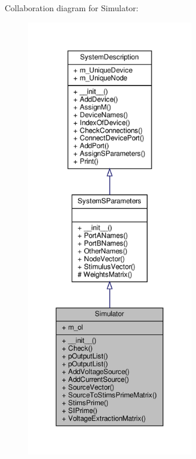 Collaboration diagram for Simulator\+:\nopagebreak
\begin{figure}[H]
\begin{center}
\leavevmode
\includegraphics[height=550pt]{classSignalIntegrity_1_1SystemDescriptions_1_1Simulator_1_1Simulator__coll__graph}
\end{center}
\end{figure}
